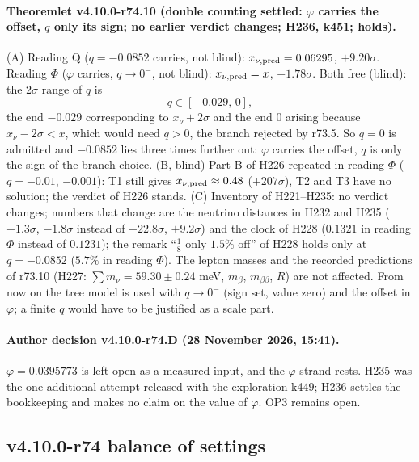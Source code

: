 \paragraph{Theoremlet v4.10.0-r74.10 (double counting settled: \(\varphi\) carries the offset, \(q\) only its sign; no earlier verdict changes; H236, k451; holds).}
(A) Reading Q (\(q=-0.0852\) carries, not blind): \(x_{\nu,\rm pred}=0.06295\), \(+9.20\sigma\).  Reading \(\Phi\) (\(\varphi\) carries, \(q\to0^-\), not
blind): \(x_{\nu,\rm pred}=x\), \(-1.78\sigma\).  Both free (blind): the \(2\sigma\) range of \(q\) is
\[
q\in[-0.029,\,0],
\]
the end \(-0.029\) corresponding to \(x_\nu+2\sigma\) and the end \(0\) arising because \(x_\nu-2\sigma<x\), which would need \(q>0\), the
branch rejected by r73.5.  So \(q=0\) is admitted and \(-0.0852\) lies three
times further out: \(\varphi\) carries the offset, \(q\) is only the sign of the branch choice.  (B, blind) Part B of H226 repeated in reading
\(\Phi\) (\(q=-0.01\), \(-0.001\)): T1 still gives \(x_{\nu,\rm pred}\approx0.48\) (\(+207\sigma\)), T2 and T3 have no solution; the verdict of H226 stands.
(C) Inventory of H221--H235: no verdict changes; numbers that change are the neutrino distances in H232 and H235 (\(-1.3\sigma\), \(-1.8\sigma\)
instead of \(+22.8\sigma\), \(+9.2\sigma\)) and the clock of H228 (\(0.1321\) in reading \(\Phi\) instead of \(0.1231\)); the remark ``\(\tfrac18\) only
\(1.5\%\) off'' of H228 holds only at \(q=-0.0852\) (\(5.7\%\) in reading \(\Phi\)).  The lepton masses and the recorded predictions of r73.10 (H227:
\(\sum m_\nu=59.30\pm0.24\) meV, \(m_\beta\), \(m_{\beta\beta}\), \(R\)) are not affected.  From now on the tree model is used with \(q\to0^-\) (sign set,
value zero) and the offset in \(\varphi\); a finite \(q\) would have to be justified as a scale part.

\paragraph{Author decision v4.10.0-r74.D (28 November 2026, 15:41).}
\(\varphi=0.0395773\) is left open as a measured input, and the \(\varphi\) strand rests.  H235 was the one additional attempt released with
the exploration k449; H236 settles the bookkeeping and makes no claim on the value of \(\varphi\).  OP3 remains open.

\subsection*{v4.10.0-r74 balance of settings}
\label{subsec:v4100-r74-balance}

